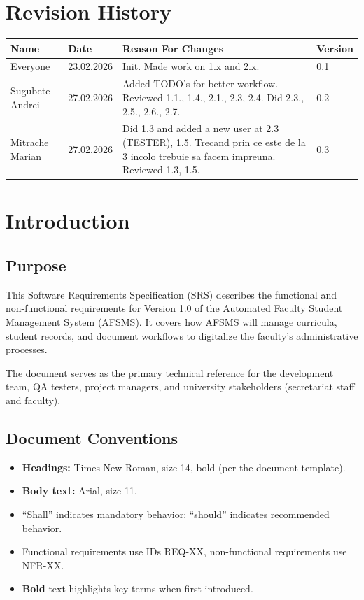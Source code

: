 \documentclass[11pt, a4paper]{article}
\begin{document}
\tableofcontents
\newpage

\section*{Revision History}

\begin{table}[htbp]
\centering
\begin{tabularx}{\textwidth}{l l X l}
\toprule
\textbf{Name} & \textbf{Date} & \textbf{Reason For Changes} & \textbf{Version} \\
\midrule
Everyone & 23.02.2026 & Init. Made work on 1.x and 2.x. & 0.1 \\
\midrule
Sugubete Andrei & 27.02.2026 & Added TODO's for better workflow. Reviewed 1.1., 1.4., 2.1., 2.3, 2.4. Did 2.3., 2.5., 2.6., 2.7. & 0.2 \\
\midrule
Mitrache Marian & 27.02.2026 & Did 1.3 and added a new user at 2.3 (TESTER), 1.5. Trecand prin ce este de la 3 incolo trebuie sa facem impreuna. Reviewed 1.3, 1.5. & 0.3 \\
\bottomrule
\end{tabularx}
\end{table}

\newpage

\section{Introduction}

\subsection{Purpose}
This Software Requirements Specification (SRS) describes the functional and non-functional requirements for Version 1.0 of the Automated Faculty Student Management System (AFSMS). It covers how AFSMS will manage curricula, student records, and document workflows to digitalize the faculty's administrative processes.

The document serves as the primary technical reference for the development team, QA testers, project managers, and university stakeholders (secretariat staff and faculty).

\subsection{Document Conventions}
\begin{itemize}
    \item \textbf{Headings:} Times New Roman, size 14, bold (per the document template).
    \item \textbf{Body text:} Arial, size 11.
    \item ``Shall'' indicates mandatory behavior; ``should'' indicates recommended behavior.
    \item Functional requirements use IDs REQ-XX, non-functional requirements use NFR-XX.
    \item \textbf{Bold} text highlights key terms when first introduced.
\end{itemize}
\end{document}
